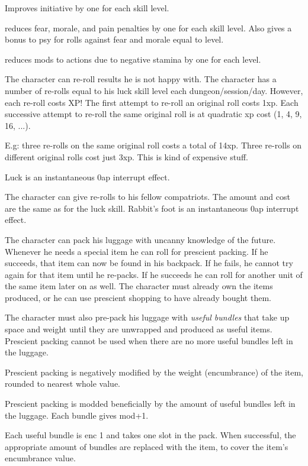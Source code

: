  Improves initiative by one for each skill level.


 reduces fear, morale, and pain penalties by one for each skill level. Also gives a bonus to psy for rolls against fear and morale equal to level.


 reduces mods to actions due to negative stamina by one for each level.


 The character can re-roll results he is not happy with. The character has a number of re-rolls equal to his luck skill level each dungeon/session/day. However, each re-roll costs XP! The first attempt to re-roll an original roll costs 1xp. Each successive attempt to re-roll the same original roll is at quadratic xp cost (1, 4, 9, 16, ...).

E.g: three re-rolls on the same original roll costs a total of 14xp. Three re-rolls on different original rolls cost just 3xp. This is kind of expensive stuff.

Luck is an instantaneous 0ap interrupt effect.


 The character can give re-rolls to his fellow compatriots. The amount and cost are the same as for the luck skill.
Rabbit's foot is an instantaneous 0ap interrupt effect.


 The character can pack his luggage with uncanny knowledge of the future. Whenever he needs a special item he can roll for prescient packing. If he succeeds, that item can now be found in his backpack. If he fails, he cannot try again for that item until he re-packs. If he succeeds he can roll for another unit of the same item later on as well.
The character must already own the items produced, or he can use prescient shopping to have already bought them.

The character must also pre-pack his luggage with \emph{useful bundles} that take up space and weight until they are unwrapped and produced as useful items. Prescient packing cannot be used when there are no more useful bundles left in the luggage.

Prescient packing is negatively modified by the weight (encumbrance) of the item, rounded to nearest whole value.

Prescient packing is modded beneficially by the amount of useful bundles left in the luggage. Each bundle gives mod+1.

Each useful bundle is enc 1 and takes one slot in the pack. When successful, the appropriate amount of bundles are replaced with the item, to cover the item's encumbrance value.

